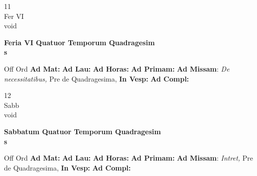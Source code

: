 \documentclass[10pt, openany]{book}
\begin{document}
    \begin{center}
        \begin{minipage}{3.5in}
            \vspace{2em}
            \begin{minipage}{0.5in}
                {\Huge 11} \\
                {\normalsize Fer VI} \\
                {\normalsize void}
            \end{minipage}
            \begin{minipage}{3.0in}
                \textbf{ \large Feria VI Quatuor Temporum Quadragesim \\
                \textnormal{\normalsize s}} \\ 
            \end{minipage}
            \begin{justify}Off Ord
                \textbf{Ad Mat: }
                \textbf{Ad Lau: }
                \textbf{Ad Horas: }
                \textbf{Ad Primam: }\textbf{Ad Missam}: \textit{De necessitatibus,} Pre de Quadragesima,  
                \textbf{In Vesp: }
                \textbf{Ad Compl: }
            \end{justify}
        \end{minipage}
    \end{center}

    \begin{center}
        \begin{minipage}{3.5in}
            \vspace{2em}
            \begin{minipage}{0.5in}
                {\Huge 12} \\
                {\normalsize Sabb} \\
                {\normalsize void}
            \end{minipage}
            \begin{minipage}{3.0in}
                \textbf{ \large Sabbatum Quatuor Temporum Quadragesim \\
                \textnormal{\normalsize s}} \\ 
            \end{minipage}
            \begin{justify}Off Ord
                \textbf{Ad Mat: }
                \textbf{Ad Lau: }
                \textbf{Ad Horas: }
                \textbf{Ad Primam: }\textbf{Ad Missam}: \textit{Intret,} Pre de Quadragesima,  
                \textbf{In Vesp: }
                \textbf{Ad Compl: }
            \end{justify}
        \end{minipage}
    \end{center}
\end{document}
